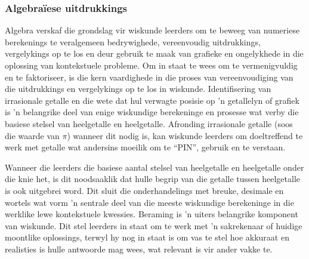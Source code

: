 \subsubsection{Algebra\"{i}ese uitdrukkings}
Algebra verskaf die grondslag vir wiskunde leerders om te beweeg van
numeriese berekenings te veralgemeen bedrywighede, vereenvoudig
uitdrukkings, vergelykings op te los en deur gebruik te maak van
grafieke en ongelykhede in die oplossing van kontekstuele probleme. Om
in staat te wees om te vermenigvuldig en te faktoriseer, is die kern
vaardighede in die proses van vereenvoudiging van die uitdrukkings en
vergelykings op te los in wiskunde. Identifisering van irrasionale
getalle en die wete dat hul verwagte posisie op 'n getallelyn of
grafiek is 'n belangrike deel van enige wiskundige berekeninge en
prosesse wat verby die basiese stelsel van heelgetalle en heelgetalle.
Afronding irrasionale getalle (soos die waarde van $\pi$) wanneer dit
nodig is, kan wiskunde leerders om doeltreffend te werk met getalle
wat andersins moeilik om te ``PIN'', gebruik en te verstaan.
\par
Wanneer die leerders die basiese aantal stelsel van heelgetalle en heelgetalle onder die knie het, is dit noodsaaklik dat hulle begrip van die getalle tussen heelgetalle is ook uitgebrei word. Dit sluit die onderhandelings met breuke, desimale en wortels wat vorm 'n sentrale deel van die meeste wiskundige berekeninge in die werklike lewe kontekstuele kwessies.
Beraming is 'n uiters belangrike komponent van wiskunde. Dit stel leerders in staat om te werk met 'n sakrekenaar of huidige moontlike oplossings, terwyl hy nog in staat is om vas te stel hoe akkuraat en realisties is hulle antwoorde mag wees, wat relevant is vir ander vakke te.

